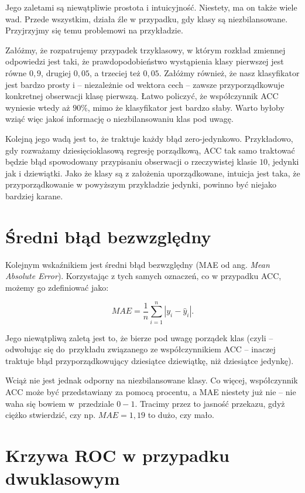 \documentclass{mini}
\begin{document}
Jego zaletami są niewątpliwie prostota i intuicyjność. Niestety, ma on także wiele wad. Przede wszystkim, działa źle w przypadku, gdy klasy są niezbilansowane. Przyjrzyjmy się temu problemowi na przykładzie. 

Załóżmy, że rozpatrujemy przypadek trzyklasowy, w którym rozkład zmiennej odpowiedzi jest taki, że prawdopodobieństwo wystąpienia klasy pierwszej jest równe $0,9$, drugiej $0,05$, a trzeciej też $0,05$. Załóżmy również, że nasz klasyfikator jest bardzo prosty i -- niezależnie od wektora cech -- zawsze przyporządkowuje konkretnej obserwacji klasę pierwszą. Łatwo policzyć, że współczynnik ACC wyniesie wtedy aż $90\%$, mimo że klasyfikator jest bardzo słaby. Warto byłoby wziąć więc jakoś informację o niezbilansowaniu klas pod uwagę.  

Kolejną jego wadą jest to, że traktuje każdy błąd zero-jedynkowo. Przykładowo, gdy rozważamy dziesięcioklasową regresję porządkową, ACC tak samo traktować będzie błąd spowodowany przypisaniu obserwacji o rzeczywistej klasie $10$, jedynki jak i dziewiątki. Jako że klasy są z założenia uporządkowane, intuicja jest taka, że przyporządkowanie w powyższym przykładzie jedynki, powinno być niejako bardziej karane.

\section{Średni błąd bezwzględny}

Kolejnym wskaźnikiem jest średni błąd bezwzględny (MAE od ang. \textit{Mean Absolute Error}). Korzystając z tych samych oznaczeń, co w przypadku ACC, możemy go zdefiniować jako:

\begin{equation}\label{dop2}
MAE = \frac{1}{n}\sum_{i=1}^n | y_i - \hat{y}_i |. 
\end{equation}

Jego niewątpliwą zaletą jest to, że bierze pod uwagę porządek klas (czyli -- odwołując się do~przykładu związanego ze współczynnikiem ACC -- inaczej traktuje błąd przyporządkowujący dziesiątce dziewiątkę, niż dziesiątce jedynkę). 

Wciąż nie jest jednak odporny na niezbilansowane klasy. Co więcej, współczynnik ACC może być przedstawiany za pomocą procentu, a MAE niestety już nie -- nie waha się bowiem w~przedziale $0-1$. Tracimy przez to jasność przekazu, gdyż ciężko stwierdzić, czy np. \mbox{$MAE=1,19$} to dużo, czy mało. 

\section{Krzywa ROC w przypadku dwuklasowym}
\end{document}

